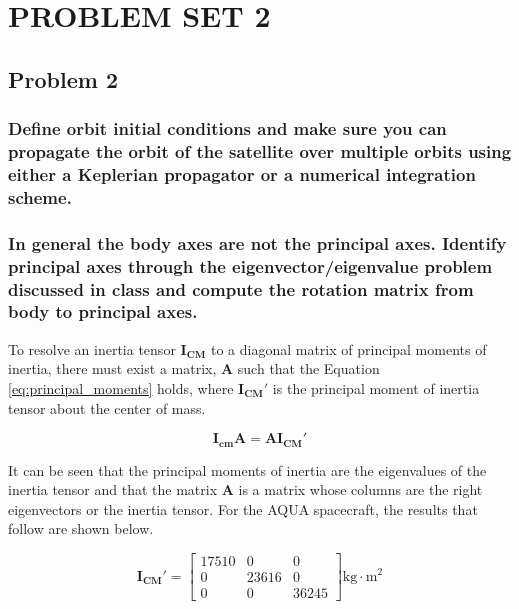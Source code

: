 \section{\Large PROBLEM SET 2}
\subsection{Problem 2}

\subsubsection{Define orbit initial conditions and make sure you can propagate the orbit of the satellite over multiple orbits using either a Keplerian propagator or a numerical integration scheme.}

\subsubsection{In general the body axes are not the principal axes. Identify principal axes through the eigenvector/eigenvalue problem discussed in class and compute the rotation matrix from body to principal axes.}

To resolve an inertia tensor $\boldsymbol{I_{CM}}$ to a diagonal matrix of principal moments of inertia, there must exist a matrix, $\boldsymbol{A}$ such that the Equation \ref{eq:principal_moments} holds, where $\boldsymbol{I_{CM}'}$ is the principal moment of inertia tensor about the center of mass.

\begin{equation} \label{eq:principal_moments}
    \boldsymbol{I_{cm} A} = \boldsymbol{A I_{CM}'} 
\end{equation}

It can be seen that the principal moments of inertia are the eigenvalues of the inertia tensor and that the matrix $\boldsymbol{A}$ is a matrix whose columns are the right eigenvectors or the inertia tensor. For the AQUA spacecraft, the results that follow are shown below.

\begin{equation*}
    \boldsymbol{I_{CM}'} = \begin{bmatrix}
        17510 & 0 & 0 \\
        0 & 23616 & 0 \\
        0 & 0 & 36245
    \end{bmatrix} \text{kg} \cdot \text{m}^2
\end{equation*}

